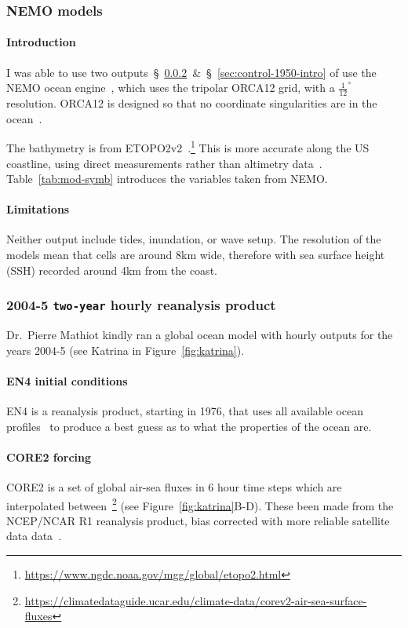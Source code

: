 \subsubsection{NEMO models}
\paragraph{Introduction}
\label{sec:nemo}
I was able to use two outputs~§~\ref{sec:rean-prod}~\&~§~\ref{sec:control-1950-intro}
of use the NEMO ocean engine~\cite{madec2015nemo}, which uses the tripolar ORCA12 grid,
with a  $\frac{1}{12}^{\circ}$
resolution.
ORCA12 is designed so that no coordinate singularities are in the ocean~\cite{madec1996global}.


 The bathymetry is from
 ETOPO2v2~\cite{lecointre2011definition, noaa20062}.\footnote{\url{https://www.ngdc.noaa.gov/mgg/global/etopo2.html}}
 This is more accurate along the US coastline, using
 direct measurements rather than altimetry data~\cite{noaa20062}.
 Table~\ref{tab:mod-symb} introduces the variables taken from NEMO.



\paragraph{Limitations}

Neither output
include tides, inundation, or wave setup.
The resolution of the models mean that cells are around
8km wide, therefore with sea surface height (SSH) recorded around 4km from the coast.

\subsubsection{2004-5 \texttt{two-year} hourly reanalysis product}
\label{sec:rean-prod}
Dr.~Pierre Mathiot kindly ran a global ocean model with
hourly outputs for the years 2004-5 (see Katrina
in Figure~\ref{fig:katrina}).

\paragraph{EN4 initial conditions}
EN4 is a reanalysis product, starting in 1976,
 that uses all available ocean profiles~\cite{good2013en4, HadObs}
to produce a best guess as to what the properties of the ocean are.


\paragraph{CORE2 forcing}
CORE2 is a set of global air-sea fluxes in 6 hour time steps which are interpolated between~\cite{griffies2012datasets,large2009global,
 hurrell2008new}\footnote{\url{https://climatedataguide.ucar.edu/climate-data/corev2-air-sea-surface-fluxes}}
 (see Figure~\ref{fig:katrina}B-D).
 These been made from the NCEP/NCAR R1 reanalysis product,
 bias corrected with more reliable satellite data data~\cite{core2, core2expert}.


